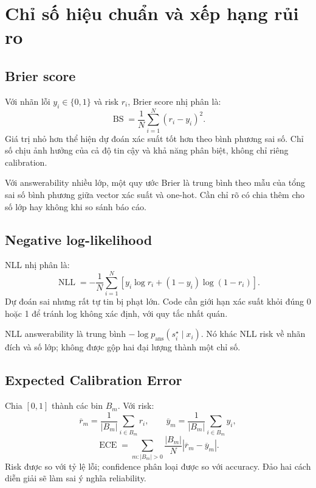 \section{Chỉ số hiệu chuẩn và xếp hạng rủi ro}
\label{sec:theory-calibration-metrics}

\subsection{Brier score}

Với nhãn lỗi $y_i\in\{0,1\}$ và risk $r_i$, Brier score nhị phân là:
\begin{equation}
    \operatorname{BS}=\frac{1}{N}\sum_{i=1}^{N}(r_i-y_i)^2.
    \label{eq:theory-brier}
\end{equation}
Giá trị nhỏ hơn thể hiện dự đoán xác suất tốt hơn theo bình phương sai số. Chỉ số chịu ảnh hưởng của cả độ tin cậy và khả năng phân biệt, không chỉ riêng calibration.

Với answerability nhiều lớp, một quy ước Brier là trung bình theo mẫu của tổng sai số bình phương giữa vector xác suất và one-hot. Cần chỉ rõ có chia thêm cho số lớp hay không khi so sánh báo cáo.

\subsection{Negative log-likelihood}

NLL nhị phân là:
\begin{equation}
    \operatorname{NLL}=-\frac{1}{N}\sum_{i=1}^{N}
    [y_i\log r_i+(1-y_i)\log(1-r_i)].
    \label{eq:theory-nll}
\end{equation}
Dự đoán sai nhưng rất tự tin bị phạt lớn. Code cần giới hạn xác suất khỏi đúng 0 hoặc 1 để tránh log không xác định, với quy tắc nhất quán.

NLL answerability là trung bình $-\log p_{\mathrm{ans}}(s_i^\star\mid x_i)$. Nó khác NLL risk về nhãn đích và số lớp; không được gộp hai đại lượng thành một chỉ số.

\subsection{Expected Calibration Error}

Chia $[0,1]$ thành các bin $B_m$. Với risk:
\begin{equation}
    \overline{r}_m=\frac{1}{|B_m|}\sum_{i\in B_m}r_i,\qquad
    \overline{y}_m=\frac{1}{|B_m|}\sum_{i\in B_m}y_i,
\end{equation}
\begin{equation}
    \operatorname{ECE}=
    \sum_{m:|B_m|>0}\frac{|B_m|}{N}
       |\overline{r}_m-\overline{y}_m|.
    \label{eq:theory-ece}
\end{equation}
Risk được so với tỷ lệ lỗi; confidence phân loại được so với accuracy. Đảo hai cách diễn giải sẽ làm sai ý nghĩa reliability.

